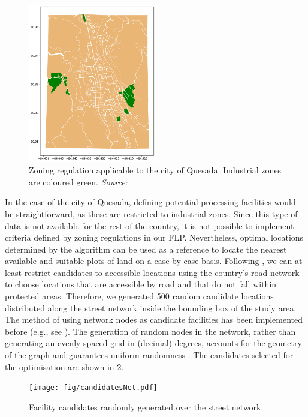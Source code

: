 \begin{figure}[!ht]
\caption[Zoning regulation applicable to the city of Quesada]{Zoning regulation applicable to the city of Quesada. Industrial zones are coloured green. \textit{Source: \citep{sancarlosPlan}}}  
\label{sanCarlosPlan}
\centering
\includegraphics[width = 0.5\textwidth]{fig/sanCarlosPlan.pdf}
\end{figure}

In the case of the city of Quesada, defining potential processing facilities would be straightforward, as these are restricted to industrial zones. Since this type of data is not available for the rest of the country, it is not possible to implement criteria defined by zoning regulations in our FLP. Nevertheless, optimal locations determined by the algorithm can be used as a reference to locate the nearest available and suitable plots of land on a case-by-case basis. Following \citeauthor{delivand2015optimal}, we can at least restrict candidates to accessible locations using the country's road network to choose locations that are accessible by road and that do not fall within protected areas. Therefore, we generated 500 random candidate locations distributed along the street network inside the bounding box of the study area. The method of using network nodes as candidate facilities has been implemented before (e.g., see \cite{zhao2015does}). The generation of random nodes in the network, rather than generating an evenly spaced grid in (decimal) degrees, accounts for the geometry of the graph and guarantees uniform randomness \cite{boeing2017osmnx}. The candidates selected for the optimisation are shown in \cref{candidatesNet}. 

\begin{figure}[H]
\caption{Facility candidates randomly generated over the street network.}  
\label{candidatesNet}
\centering
\texttt{[image: fig/candidatesNet.pdf]}
\end{figure}


